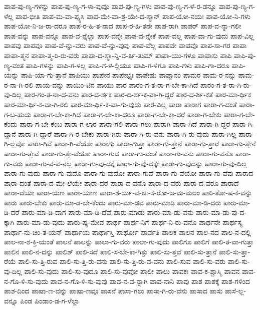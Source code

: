 {ಪಾಪ-ಪು-ಣ್ಯ-ಗಳನ್ನು
ಪಾಪ-ಪು-ಣ್ಯ-ಗ-ಳಾ-ವುವೂ
ಪಾಪ-ಪು-ಣ್ಯ-ಗಳು
ಪಾಪ-ಪು-ಣ್ಯ-ಗ-ಳೆ-ರ-ಡನ್ನೂ
ಪಾಪ-ಪು-ಣ್ಯ-ಗ-ಳೆಲ್ಲ
ಪಾಪ-ಭೀತಿ
ಪಾಪ-ಮ-ವಾ-ಪ್ಸ್ಯಸಿ
ಪಾಪ-ಮೇ-ವಾ-ಶ್ರ-ಯೇ-ದ-ಸ್ಮಾನ್
ಪಾಪ-ಯೋ-ನಯಃ
ಪಾಪ-ಯೋ-ನಿ-ಗಳು
ಪಾಪ-ಯೋ-ನಿ-ಜ-ರಾ-ದರೂ
ಪಾಪ-ರ-ಹಿ-ತ-ನಾದ
ಪಾಪ-ರ-ಹಿ-ತನೇ
ಪಾಪ-ರಾಗಿ
ಪಾಪರ್
ಪಾಪ-ವ-ನ್ನಾ-ಗಲೀ
ಪಾಪ-ವನ್ನು
ಪಾಪ-ವನ್ನೂ
ಪಾಪ-ವ-ನ್ನೆಲ್ಲಾ
ಪಾಪ-ವನ್ನೇ
ಪಾಪ-ವ-ನ್ನೇಕೆ
ಪಾಪ-ವಲ್ಲ
ಪಾಪ-ವಾ-ಗು-ವುದು
ಪಾಪ-ವಿಲ್ಲ
ಪಾಪವು
ಪಾಪವೂ
ಪಾಪ-ವೆ-ನ್ನು-ವರು
ಪಾಪ-ವೆ-ನ್ನು-ವುವು
ಪಾಪ-ವೆಲ್ಲ
ಪಾಪವೇ
ಪಾಪವೊ
ಪಾಪ-ಸಾ-ಗರ
ಪಾಪಾ
ಪಾಪಾ-ತ್ಮನ
ಪಾಪಾ-ತ್ಮ-ರಿ-ರು-ವರು
ಪಾಪಾ-ದ-ಸ್ಮಾ-ನ್ನಿ-ವ-ರ್ತಿ-ತುಮ್
ಪಾಪಾ-ಯು-ಗಳೂ
ಪಾಪಾಸು
ಪಾಪಿ
ಪಾಪಿ-ಪು-ಣ್ಯ-ವಂತ
ಪಾಪಿ-ಗಳನ್ನು
ಪಾಪಿ-ಗ-ಳಲ್ಲ
ಪಾಪಿ-ಗ-ಳ-ಲ್ಲಿಯೂ
ಪಾಪಿ-ಗ-ಳಿಗೂ
ಪಾಪಿ-ಗಳು
ಪಾಪಿ-ಗಾ-ದರೂ
ಪಾಪಿ-ಯನ್ನು
ಪಾಪಿ-ಯಾ-ಗು-ತ್ತಾನೆ
ಪಾಪಿಯು
ಪಾಪೇನ
ಪಾಪೇಭ್ಯಃ
ಪಾಪೇಷು
ಪಾಪ್ಮಾನಂ
ಪಾಮರ
ಪಾಮ-ರ-ನನ್ನು
ಪಾಮ-ರ-ನಾ-ಗಿ-ರಲಿ
ಪಾಯ-ವನ್ನು
ಪಾಯಿಂ-ಟಿನ
ಪಾಯು
ಪಾರ
ಪಾರಂ-ಗ-ತ-ರಾ-ಗ-ಬೇ-ಕಾ-ಗಿದೆ
ಪಾರಂ-ಗ-ತ-ರಾ-ಗಿ-ರು-ವು-ದಿಲ್ಲ
ಪಾರ-ಗಂ-ತ-ನಾ-ದ-ವನು
ಪಾರ-ದ-ರ್ಶಕ
ಪಾರ-ದ-ರ್ಶ-ಕ-ವಾ-ಗಿ-ದ್ದರೆ
ಪಾರ-ದ-ರ್ಶಿ-ಕತೆ
ಪಾರ-ಮಾ-ರ್ಥಿಕ
ಪಾರ-ಮಾ-ರ್ಥಿ-ಕ-ವಾ-ಗಿ-ರಲಿ
ಪಾರ-ಮಾ-ರ್ಥಿ-ಕ-ವಾ-ಗು-ವುದು
ಪಾರ-ವಿಲ್ಲ
ಪಾರಾ
ಪಾರಾಗ
ಪಾರಾ-ಗ-ದಂತೆ
ಪಾರಾ-ಗ-ಬ-ಹುದು
ಪಾರಾ-ಗ-ಬೇ-ಕಾ-ಗಿದೆ
ಪಾರಾ-ಗ-ಬೇ-ಕಾ-ದರೂ
ಪಾರಾ-ಗ-ಬೇ-ಕಾ-ದರೆ
ಪಾರಾ-ಗ-ಬೇಕು
ಪಾರಾ-ಗ-ಬೇ-ಕೆಂದು
ಪಾರಾ-ಗ-ಬೇ-ಕೆಂಬ
ಪಾರಾ-ಗ-ಲಾರ
ಪಾರಾ-ಗಲಿ
ಪಾರಾ-ಗಲು
ಪಾರಾಗಿ
ಪಾರಾ-ಗಿದೆ
ಪಾರಾ-ಗಿ-ದ್ದರೆ
ಪಾರಾ-ಗಿ-ದ್ದಾನೆ
ಪಾರಾ-ಗಿ-ದ್ದಾರೆ
ಪಾರಾ-ಗಿ-ರ-ಬೇಕು
ಪಾರಾ-ಗಿರು
ಪಾರಾ-ಗಿ-ರು-ವನು
ಪಾರಾ-ಗಿ-ರು-ವುದು
ಪಾರಾ-ಗಿಲ್ಲ
ಪಾರಾ-ಗಿ-ಲ್ಲವೋ
ಪಾರಾ-ಗಿವೆ
ಪಾರಾ-ಗಿ-ವೆಯೋ
ಪಾರಾಗು
ಪಾರಾ-ಗುತ್ತಾ
ಪಾರಾ-ಗು-ತ್ತಾನೆ
ಪಾರಾ-ಗು-ತ್ತಾರೆ
ಪಾರಾ-ಗು-ತ್ತೇನೆ
ಪಾರಾ-ಗು-ತ್ತೇವೆ
ಪಾರಾ-ಗು-ತ್ತೇ-ವೆಯೋ
ಪಾರಾ-ಗುವ
ಪಾರಾ-ಗು-ವಂತೆ
ಪಾರಾ-ಗು-ವನು
ಪಾರಾ-ಗು-ವನೊ
ಪಾರಾ-ಗು-ವರು
ಪಾರಾ-ಗು-ವ-ವ-ನಲ್ಲ
ಪಾರಾ-ಗು-ವು-ದಕ್ಕೆ
ಪಾರಾ-ಗು-ವು-ದಕ್ಕೇ
ಪಾರಾ-ಗು-ವುದನ್ನು
ಪಾರಾ-ಗು-ವು-ದಿಲ್ಲ
ಪಾರಾ-ಗು-ವುದು
ಪಾರಾ-ಗು-ವುದೊ
ಪಾರಾ-ಗು-ವುದೋ
ಪಾರಾ-ಗುವೆ
ಪಾರಾ-ಗು-ವೆಯೋ
ಪಾರಾ-ಗು-ವೆವು
ಪಾರಾದ
ಪಾರಾ-ದಂತೆ
ಪಾರಾ-ದ-ಮೇ-ಲೆಯೇ
ಪಾರಾ-ದರೆ
ಪಾರಾ-ದ-ವನೊ
ಪಾರಾ-ದ-ವರು
ಪಾರಾ-ದ-ವರೂ
ಪಾರಾದೆ
ಪಾರಾ-ದೆಯಾ
ಪಾರಾ-ಯಣ
ಪಾರಾ-ಯಾಣ
ಪಾರಾ-ಶ-ರ್ಯ-ವ-ಚಃ-ಸ-ರೋ-ಜ-ಮ-ಮಲಂ
ಪಾರಿ-ತೋ-ಷ-ಕ-ವನ್ನು
ಪಾರು
ಪಾರು-ಬೇಕು
ಪಾರು-ಮಾ-ಡ-ಬೇ-ಕೆಂದು
ಪಾರು-ಮಾ-ಡವ
ಪಾರು-ಮಾಡಿ
ಪಾರು-ಮಾ-ಡಿ-ದರು
ಪಾರು-ಮಾ-ಡಿ-ದರೆ
ಪಾರು-ಮಾ-ಡಿ-ದಾಗ
ಪಾರು-ಮಾ-ಡಿ-ದೆವೆ
ಪಾರು-ಮಾಡು
ಪಾರು-ಮಾ-ಡು-ವನು
ಪಾರು-ಮಾ-ಡು-ವು-ದ-ಕ್ಕಾಗಿ
ಪಾರು-ಮಾ-ಡು-ವುದು
ಪಾರು-ಷ್ಯ-ಮೇವ
ಪಾರ್ಥ
ಪಾರ್ಥ-ನಿಗೆ
ಪಾರ್ಥ-ನಿ-ರು-ವನೊ
ಪಾರ್ಥನೇ
ಪಾರ್ಥಸ್ಯ
ಪಾರ್ಥಾ-ನು-ಚಿಂ-ತ-ಯನ್
ಪಾರ್ಥಾಯ
ಪಾರ್ಥಾಸ್ತಿ
ಪಾರ್ಥೋ
ಪಾರ್ವತಿ
ಪಾಲಕ
ಪಾಲನ
ಪಾಲ-ನದ
ಪಾಲ-ನ-ದಲ್ಲಿ
ಪಾಲ-ನಾ-ಶ-ಕ್ತಿ-ಯಂತೆ
ಪಾಲನೆ
ಪಾಲನ್ನು
ಪಾಲಾ-ಗು-ವರು
ಪಾಲಾ-ಗು-ವುದು
ಪಾಲಿಗೂ
ಪಾಲಿಗೆ
ಪಾಲಿ-ತ-ವಾ-ಗುತ್ತಾ
ಪಾಲಿನ
ಪಾಲಿ-ನ-ದನ್ನು
ಪಾಲಿಶ್
ಪಾಲಿ-ಸದೆ
ಪಾಲಿ-ಸ-ಬೇ-ಕಾ-ಗಿತ್ತು
ಪಾಲಿ-ಸು-ತ್ತವೆ
ಪಾಲಿ-ಸು-ತ್ತಾನೆ
ಪಾಲಿ-ಸು-ತ್ತಾ-ರೆಯೆ
ಪಾಲಿ-ಸು-ತ್ತಿ-ರುವ
ಪಾಲಿ-ಸು-ತ್ತಿ-ರು-ವನು
ಪಾಲಿ-ಸು-ತ್ತಿ-ರು-ವ-ವನು
ಪಾಲಿ-ಸುವ
ಪಾಲಿ-ಸು-ವರು
ಪಾಲಿ-ಸು-ವು-ದಿಲ್ಲ
ಪಾಲಿ-ಸು-ವುದು
ಪಾಲಿ-ಸು-ವುದೂ
ಪಾಲಿ-ಸು-ವುವೋ
ಪಾಲೀ
ಪಾಲು
ಪಾವಕಃ
ಪಾವ-ಕ-ಶ್ಚಾಸ್ಮಿ
ಪಾವನ
ಪಾವ-ನ-ಗೊ-ಳಿ-ಸು-ವುದು
ಪಾವ-ನ-ಗೊ-ಳಿ-ಸು-ವುವು
ಪಾವ-ನ-ವ-ನ್ನಾಗಿ
ಪಾವ-ನಾನಿ
ಪಾವು
ಪಾಶ
ಪಾಶಕ್ಕೆ
ಪಾಶ-ಗಳಿಂದ
ಪಾಶ-ದಿಂದ
ಪಾಷಾ-ಣ-ವನ್ನು
ಪಾಷಾ-ಣವೂ
ಪಾಸನೆ
ಪಾಸಾ-ಗಲು
ಪಾಸಾ-ಗಿ-ರು-ವೆನು
ಪಾಸಾದ
ಪಾಸು
ಪಾಸೆ-ಲ್ಲ-ವನ್ನೂ
ಪಿಂಡ
ಪಿಂಡಾಂ-ಡ-ಗ-ಳೆಲ್ಲಾ
}
